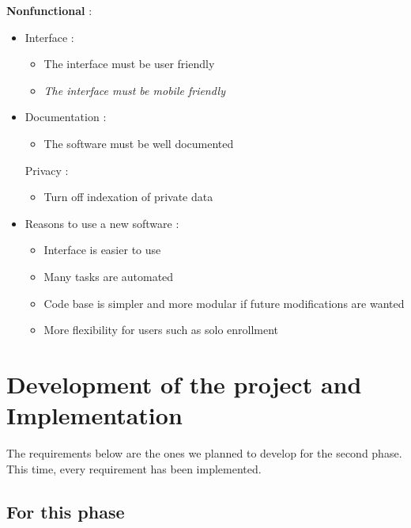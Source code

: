 \documentclass[a4paper, 12pt]{article}
\begin{document}
\textbf{Nonfunctional} :
\begin{itemize}


	\item Interface :
	
	\begin{itemize}
		\item The interface must be user friendly
		\item \textit{The interface must be mobile friendly}
	\end{itemize}

	\item Documentation :
	
	\begin{itemize}
		\item The software must be well documented

	\end{itemize}
	
    Privacy :
    
    \begin{itemize}
    	\item Turn off indexation of private data

    \end{itemize}



\item Reasons to use a new software :


	\begin{itemize}
		\item Interface is easier to use
		\item Many tasks are automated
		\item Code base is simpler and more modular if future modifications are wanted
		\item More flexibility for users such as solo enrollment
	\end{itemize}

\end{itemize}
\newpage
\section{Development of the project and Implementation}

The requirements below are the ones we planned to develop for the second phase. This time, every requirement has been implemented. \\
\subsection{For this phase}
	
\end{document}
